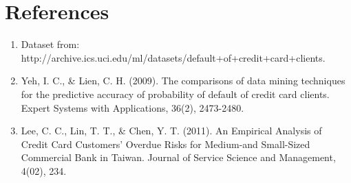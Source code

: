 \documentclass{article}
\begin{document}
\section{References}
\begin{enumerate}
\item Dataset from: http://archive.ics.uci.edu/ml/datasets/default+of+credit+card+clients.
\item Yeh, I. C., & Lien, C. H. (2009). The comparisons of data mining techniques for the predictive accuracy of probability of default of credit card clients. Expert Systems with Applications, 36(2), 2473-2480.
\item Lee, C. C., Lin, T. T., & Chen, Y. T. (2011). An Empirical Analysis of Credit Card Customers’ Overdue Risks for Medium-and Small-Sized Commercial Bank in Taiwan. Journal of Service Science and Management, 4(02), 234.
\end{enumerate}
\end{document}
